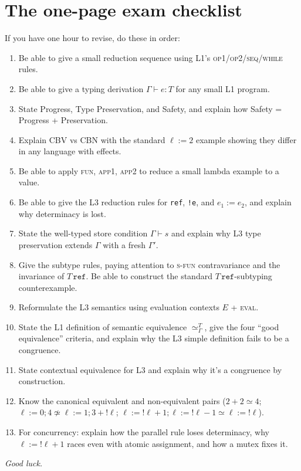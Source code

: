 \documentclass[11pt,a4paper]{article}
\newcommand{\rname}[1]{\textsc{\footnotesize#1}}
\begin{document}
\section{The one-page exam checklist}

\begin{must}
If you have one hour to revise, do these in order:
\begin{enumerate}[leftmargin=*,itemsep=2pt]
  \item Be able to give a small reduction sequence using L1's \rname{op1}/\rname{op2}/\rname{seq}/\rname{while} rules.
  \item Be able to give a typing derivation $\Gamma \vdash e : T$ for any small L1 program.
  \item State Progress, Type Preservation, and Safety, and explain how Safety = Progress + Preservation.
  \item Explain CBV vs CBN with the standard $\ell := 2$ example showing they differ in any language with effects.
  \item Be able to apply \rname{fun}, \rname{app1}, \rname{app2} to reduce a small lambda example to a value.
  \item Be able to give the L3 reduction rules for \texttt{ref}, \texttt{!e}, and $e_1 := e_2$, and explain why determinacy is lost.
  \item State the well-typed store condition $\Gamma \vdash s$ and explain why L3 type preservation extends $\Gamma$ with a fresh $\Gamma'$.
  \item Give the subtype rules, paying attention to \rname{s-fun} contravariance and the invariance of $T\,\texttt{ref}$. Be able to construct the standard $T\,\texttt{ref}$-subtyping counterexample.
  \item Reformulate the L3 semantics using evaluation contexts $E$ + \rname{eval}.
  \item State the L1 definition of semantic equivalence $\simeq^T_\Gamma$, give the four ``good equivalence'' criteria, and explain why the L3 simple definition fails to be a congruence.
  \item State contextual equivalence for L3 and explain why it's a congruence by construction.
  \item Know the canonical equivalent and non-equivalent pairs ($2+2 \simeq 4$; $\ell:=0;4 \not\simeq \ell:=1; 3+!\ell$; $\ell:=!\ell+1; \ell:=!\ell-1 \simeq \ell:=!\ell$).
  \item For concurrency: explain how the parallel rule loses determinacy, why $\ell:=!\ell+1$ races even with atomic assignment, and how a mutex fixes it.
\end{enumerate}
\end{must}

\vspace{0.3cm}
\begin{center}
\textit{Good luck.}
\end{center}
\end{document}
